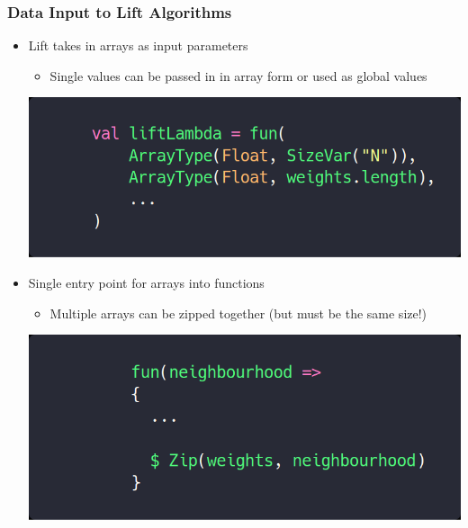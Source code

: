 \documentclass[10pt]{beamer}
\begin{document}
\begin{frame}
\frametitle{Data Input to Lift Algorithms}
\begin{itemize}
    \item Lift takes in arrays as input parameters
            \begin{itemize}
                \item Single values can be passed in in array form or used as global values
            \end{itemize}
\begin{block}{}
    \begin{center}
    \includegraphics[width=.5\textwidth]{../images/inputData.png}
    \end{center}
\end{block}
    \item Single entry point for arrays into functions  
            \begin{itemize}
                \item Multiple arrays can be zipped together (but must be the same size!) 
            \end{itemize}
            \vspace{-.4cm}
\begin{block}{}
    \begin{center}
    \includegraphics[width=.5\textwidth]{../images/zippedData.png}
    \end{center}
\end{block}
\end{itemize}
\end{frame}
\end{document}

